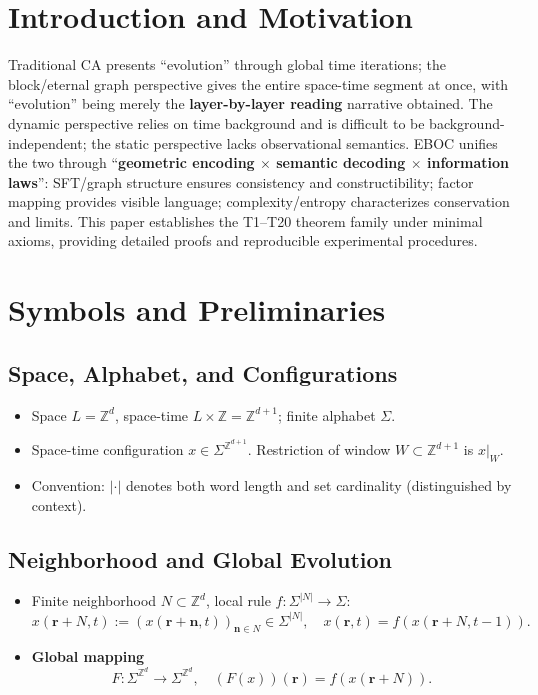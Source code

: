 \documentclass[11pt]{article}
\theoremstyle{definition}
\theoremstyle{remark}
\begin{document}
\section{Introduction and Motivation}

Traditional CA presents ``evolution'' through global time iterations; the block/eternal graph perspective gives the entire space-time segment at once, with ``evolution'' being merely the \textbf{layer-by-layer reading} narrative obtained. The dynamic perspective relies on time background and is difficult to be background-independent; the static perspective lacks observational semantics. EBOC unifies the two through ``\textbf{geometric encoding \(\times\) semantic decoding \(\times\) information laws}'': SFT/graph structure ensures consistency and constructibility; factor mapping provides visible language; complexity/entropy characterizes conservation and limits. This paper establishes the T1--T20 theorem family under minimal axioms, providing detailed proofs and reproducible experimental procedures.

\section{Symbols and Preliminaries}

\subsection{Space, Alphabet, and Configurations}

\begin{itemize}
\item Space \( L = \mathbb{Z}^d \), space-time \( L \times \mathbb{Z} = \mathbb{Z}^{d+1} \); finite alphabet \( \Sigma \).
\item Space-time configuration \( x \in \Sigma^{\mathbb{Z}^{d+1}} \). Restriction of window \( W \subset \mathbb{Z}^{d+1} \) is \( x|_W \).
\item Convention: \( |\cdot| \) denotes both word length and set cardinality (distinguished by context).
\end{itemize}

\subsection{Neighborhood and Global Evolution}

\begin{itemize}
\item Finite neighborhood \( N \subset \mathbb{Z}^d \), local rule \( f: \Sigma^{|N|} \to \Sigma \):
\[
x(\mathbf{r} + N, t) := (x(\mathbf{r} + \mathbf{n}, t))_{\mathbf{n} \in N} \in \Sigma^{|N|}, \quad x(\mathbf{r}, t) = f(x(\mathbf{r} + N, t-1)).
\]
\item \textbf{Global mapping}
\[
F: \Sigma^{\mathbb{Z}^d} \to \Sigma^{\mathbb{Z}^d}, \quad (F(x))(\mathbf{r}) = f(x(\mathbf{r} + N)).
\]
\end{itemize}
\end{document}
